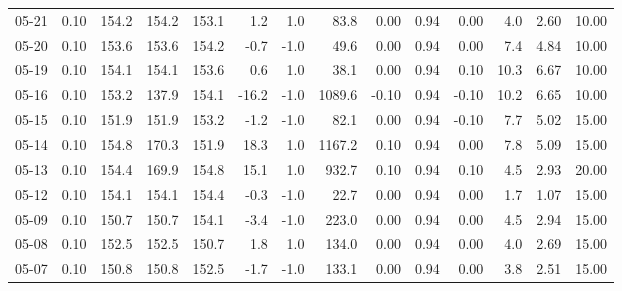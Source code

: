 \begin{threeparttable}
{\begin{tabular}{lrrrrrrrrrrrrr}
  05-21 &     0.10 & 154.2 & 154.2 & 153.1 &        1.2 &                      1.0 &                83.8 &       0.00 &      0.94 &           0.00 &              4.0 &            2.60 &                  10.00 \\
  05-20 &     0.10 & 153.6 & 153.6 & 154.2 &       -0.7 &                     -1.0 &                49.6 &       0.00 &      0.94 &           0.00 &              7.4 &            4.84 &                  10.00 \\
  05-19 &     0.10 & 154.1 & 154.1 & 153.6 &        0.6 &                      1.0 &                38.1 &       0.00 &      0.94 &           0.10 &             10.3 &            6.67 &                  10.00 \\
  05-16 &     0.10 & 153.2 & 137.9 & 154.1 &      -16.2 &                     -1.0 &              1089.6 &      -0.10 &      0.94 &          -0.10 &             10.2 &            6.65 &                  10.00 \\
  05-15 &     0.10 & 151.9 & 151.9 & 153.2 &       -1.2 &                     -1.0 &                82.1 &       0.00 &      0.94 &          -0.10 &              7.7 &            5.02 &                  15.00 \\
  05-14 &     0.10 & 154.8 & 170.3 & 151.9 &       18.3 &                      1.0 &              1167.2 &       0.10 &      0.94 &           0.00 &              7.8 &            5.09 &                  15.00 \\
  05-13 &     0.10 & 154.4 & 169.9 & 154.8 &       15.1 &                      1.0 &               932.7 &       0.10 &      0.94 &           0.10 &              4.5 &            2.93 &                  20.00 \\
  05-12 &     0.10 & 154.1 & 154.1 & 154.4 &       -0.3 &                     -1.0 &                22.7 &       0.00 &      0.94 &           0.00 &              1.7 &            1.07 &                  15.00 \\
  05-09 &     0.10 & 150.7 & 150.7 & 154.1 &       -3.4 &                     -1.0 &               223.0 &       0.00 &      0.94 &           0.00 &              4.5 &            2.94 &                  15.00 \\
  05-08 &     0.10 & 152.5 & 152.5 & 150.7 &        1.8 &                      1.0 &               134.0 &       0.00 &      0.94 &           0.00 &              4.0 &            2.69 &                  15.00 \\
  05-07 &     0.10 & 150.8 & 150.8 & 152.5 &       -1.7 &                     -1.0 &               133.1 &       0.00 &      0.94 &           0.00 &              3.8 &            2.51 &                  15.00 \\

\end{tabular}}
\end{threeparttable}
